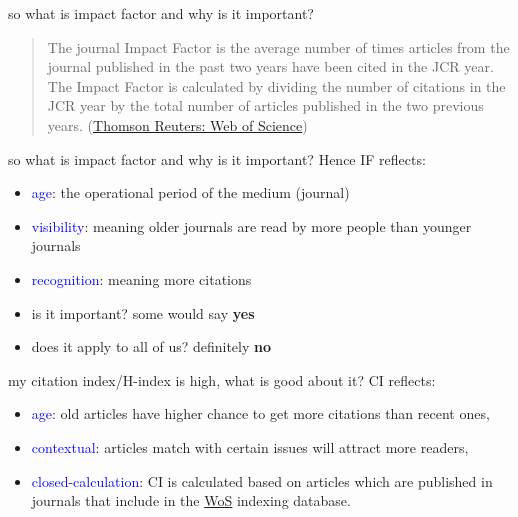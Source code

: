 \documentclass[10pt]{beamer}
\begin{document}
\begin{frame}{so what is impact factor and why is it important?}
  \begin{quote}
  The journal Impact Factor is the average number of times articles from the journal published in the past two years have been cited in the JCR year. The Impact Factor is calculated by dividing the number of citations in the JCR year by the total number of articles published in the two previous years. (\href{admin-apps.webofknowledge.com/JCR/help/h_impfact.htm}{Thomson Reuters: Web of Science})
  \end{quote}
\end{frame}
  
\begin{frame}{so what is impact factor and why is it important?}
  Hence IF reflects:
      \begin{itemize}
      \item \textcolor{blue}{age}: the operational period of the medium (journal)
      \item \textcolor{blue}{visibility}: meaning older journals are read by more people than younger journals
      \item \textcolor{blue}{recognition}: meaning more citations
 	 \end{itemize}  
\end{frame}

\begin{frame}[standout]
    \begin{itemize}
	\item is it important? some would say \textbf{yes}
	\item does it apply to all of us? definitely \textbf{no}    
	\end{itemize}
\end{frame}

\begin{frame}{my citation index/H-index is high, what is good about it?}
   CI reflects:
     \begin{itemize}
     \item \textcolor{blue}{age}: old articles have higher chance to get more citations than recent ones,
     \item \textcolor{blue}{contextual}: articles match with certain issues will attract more readers,
     \item \textcolor{blue}{closed-calculation}: CI is calculated based on articles which are published in journals that include in the \href{http://isiknowledge.com/wos}{WoS} indexing database.
     \end{itemize}
\end{frame}
\end{document}
